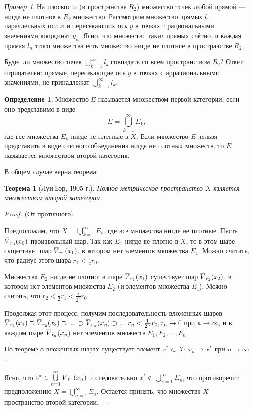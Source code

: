 \documentclass[12pt,a4paper,titlepage,oneside]{book}
\newcommand{\overbar}[1]{\mkern 1.5mu\overline{\mkern-1.5mu#1\mkern-1.5mu}\mkern 1.5mu}
\theoremstyle{definition}
\newtheorem*{definition}{Определение}
\theoremstyle{plain}
\newtheorem*{theorem}{Теорема}
\theoremstyle{remark}
\theoremstyle{remark}
\newtheorem*{example}{Пример}
\theoremstyle{remark}
\theoremstyle{remark}
\theoremstyle{plain}
\theoremstyle{plain}
\begin{document}
\begin{example}
На плоскости (в пространстве $R_2$) множество точек любой прямой --- нигде не плотное в $R_2$ множество.
Рассмотрим множество прямых $l$, параллельных оси $x$ и пересекающих ось $y$ в точках с рациональными значениями координат $y_n$. Ясно, что множество таких прямых счётно, и каждая прямая $l_n$ этого множества есть множество нигде не плотное в пространстве $R_2$.
\end{example}

Будет ли множество точек $\bigcup\limits_{k=1}^\infty l_k$ совпадать со всем пространством $R_2$? Ответ отрицателен: прямые, пересекающие ось $y$ в точках с иррациональными значениями, не принадлежат $\bigcup\limits_{k=1}^\infty l_k$.

\begin{definition}
Множество $E$ называется множеством первой категории, если оно представимо в виде 
$$E=\bigcup\limits_{k=1}^\infty E_k,$$ 
где все множества $E_k$ нигде не плотные в $X$. Если множество $E$ нельзя представить в виде счетного объединения нигде не плотных множеств, то $E$ называется множеством второй категории.
\end{definition}

В общем случае верна теорема:

\begin{theorem}[Луи Бэр, 1905 г.]
Полное метрическое пространство $X$ является множеством второй категории.
\end{theorem}

\begin{proof}
(От противного)

Предположим, что $X=\bigcup\limits_{k=1}^\infty E_k$, где все множества нигде не плотные. Пусть $\overbar{V}_{r_0}(x_0)$ произвольный шар. Так как $E_1$ нигде не плотно в $X$, то в этом шаре существует шар $\overbar{V}_{r_1}(x_1)$, в котором нет элементов множества $E_1$. Можно считать, что радиус этого шара $r_1 < \frac{1}{2}r_0$.

Множество $E_2$ нигде не плотно: в шаре $\overbar{V}_{r_1}(x_1)$ существует шар $\overbar{V}_{r_2}(x_2)$, в котором нет элементов множества $E_2$ (и элементов множества $E_1$). Можно считать, что $r_2 < \frac{1}{2}r_1 < \frac{1}{2^2}r_0$.

Продолжая этот процесс, получим последовательность вложенных шаров $\overbar{V}_{r_1}(x_1) \supset \overbar{V}_{r_2}(x_2) \supset$ ... $\supset \overbar{V}_{r_n}(x_n) \supset ...; r_n < \frac{1}{2^n}r_0, r_n \to 0$ при $n \to \infty$, и в каждом шаре $\overbar{V}_{r_n}(x_n)$ нет элементов множеств $E_1, E_2, ..., E_n$.

По теореме о вложенных шарах существует элемент $x^*\subset X$:
$x_n \to x^*$ при $n \to \infty$.

Ясно, что $x^*\in \bigcup\limits_{n=1}^\infty \overbar{V}_{r_n}(x_n)$ и следовательно $x^*\notin \bigcup\limits_{n=1}^\infty E_n$, что противоречит предположению $X=\bigcup\limits_{n=1}^\infty E_n$. Остается принять, что множество $X$ пространство второй категории.

\end{proof}
\end{document}
